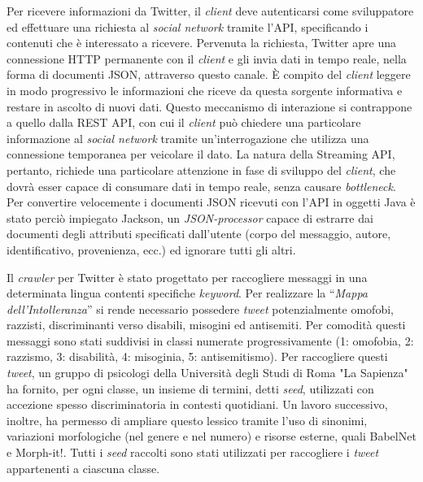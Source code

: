Per ricevere informazioni da Twitter, il \textit{client} deve autenticarsi come sviluppatore ed effettuare una richiesta al \textit{social network} tramite l’API, specificando i contenuti che è 
interessato a ricevere. Pervenuta la richiesta, Twitter apre una connessione HTTP permanente con il \textit{client} e gli invia dati in tempo reale, nella forma di documenti JSON, attraverso
questo canale. È compito del \textit{client} leggere in modo progressivo le informazioni che riceve da questa sorgente informativa e restare in ascolto di nuovi dati. Questo meccanismo di
interazione si contrappone a quello dalla REST API, con cui il \textit{client} può chiedere una particolare informazione al \textit{social network} tramite un’interrogazione che utilizza una connessione
temporanea per veicolare il dato. La natura della Streaming API, pertanto, richiede una particolare attenzione in fase di sviluppo del \textit{client}, che dovrà esser capace di consumare 
dati in tempo reale, senza causare \textit{bottleneck}. Per convertire velocemente i documenti JSON ricevuti con l’API in oggetti Java è stato perciò impiegato Jackson, un \textit{JSON-processor} 
capace di estrarre dai documenti degli attributi specificati dall’utente (corpo del messaggio, autore, identificativo, provenienza, ecc.) ed ignorare tutti gli altri. 

Il \textit{crawler} per Twitter è stato progettato per raccogliere messaggi in una determinata lingua contenti specifiche \textit{keyword}. Per realizzare la ``\textit{Mappa dell’Intolleranza}'' si rende necessario 
possedere \textit{tweet} potenzialmente omofobi, razzisti, discriminanti verso disabili, misogini ed antisemiti. Per comodità questi messaggi sono stati suddivisi in classi numerate 
progressivamente (1: omofobia, 2: razzismo, 3: disabilità, 4: misoginia, 5: antisemitismo). Per raccogliere questi \textit{tweet}, un gruppo di psicologi della Università degli Studi di Roma 
"La Sapienza" ha fornito, per ogni classe, un insieme di termini, detti \textit{seed}, utilizzati con accezione spesso discriminatoria in contesti quotidiani. Un lavoro successivo, inoltre, 
ha permesso di ampliare questo lessico tramite l’uso di sinonimi, variazioni morfologiche (nel genere e nel numero) e risorse esterne, quali BabelNet e Morph-it!. 
Tutti i \textit{seed} raccolti sono stati utilizzati per raccogliere i \textit{tweet} appartenenti a ciascuna classe.

